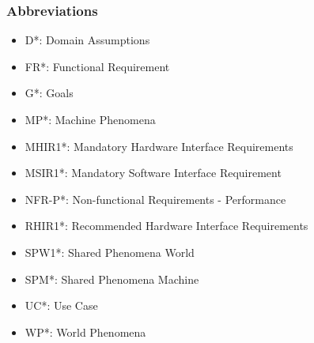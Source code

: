 \subsubsection{Abbreviations}
\begin{itemize}
    \item D*: Domain Assumptions
    \item FR*: Functional Requirement
    \item G*: Goals
    \item MP*: Machine Phenomena
    \item MHIR1*: Mandatory Hardware Interface Requirements
    \item MSIR1*: Mandatory Software Interface Requirement
    \item NFR-P*: Non-functional Requirements - Performance
    \item RHIR1*: Recommended Hardware Interface Requirements
    \item SPW1*: Shared Phenomena World
    \item SPM*: Shared Phenomena Machine
    \item UC*: Use Case
    \item WP*: World Phenomena
\end{itemize}
